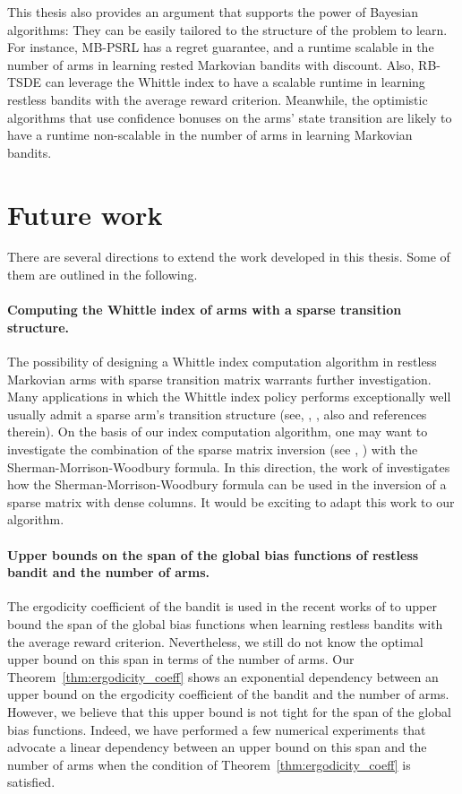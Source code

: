 This thesis also provides an argument that supports the power of Bayesian algorithms: They can be easily tailored to the structure of the problem to learn.
For instance, MB-PSRL has a regret guarantee, and a runtime scalable in the number of arms in learning rested Markovian bandits with discount.
Also, RB-TSDE \cite{akbarzadeh2022learning} can leverage the Whittle index to have a scalable runtime in learning restless bandits with the average reward criterion.
Meanwhile, the optimistic algorithms that use confidence bonuses on the arms' state transition are likely to have a runtime non-scalable in the number of arms in learning Markovian bandits.


\section{Future work}

There are several directions to extend the work developed in this thesis. Some of them are outlined in the following.

\paragraph{Computing the Whittle index of arms with a sparse transition structure.}
The possibility of designing a Whittle index computation algorithm in restless Markovian arms with sparse transition matrix warrants further investigation.
Many applications in which the Whittle index policy performs exceptionally well usually admit a sparse arm's transition structure (see, \eg, \cite{wang1995finite, nino2002dynamic, aalto2018whittle}, also \cite{wang2020restless} and references therein).
On the basis of our index computation algorithm, one may want to investigate the combination of the sparse matrix inversion (see \eg, \cite{dulmage1962inversion, niessner1983computing}) with the Sherman-Morrison-Woodbury formula.
In this direction, the work of \cite{vanderbei1991splitting} investigates how the Sherman-Morrison-Woodbury formula can be used in the inversion of a sparse matrix with dense columns.
It would be exciting to adapt this work to our algorithm.

\paragraph{Upper bounds on the span of the global bias functions of restless bandit and the number of arms.}
The ergodicity coefficient of the bandit is used in the recent works of \cite{akbarzadeh2022learning, xiong2022learning} to upper bound the span of the global bias functions when learning restless bandits with the average reward criterion.
Nevertheless, we still do not know the optimal upper bound on this span in terms of the number of arms. 
Our Theorem~\ref{thm:ergodicity_coeff} shows an exponential dependency between an upper bound on the ergodicity coefficient of the bandit and the number of arms.
However, we believe that this upper bound is not tight for the span of the global bias functions.
Indeed, we have performed a few numerical experiments that advocate a linear dependency between an upper bound on this span and the number of arms when the condition of Theorem~\ref{thm:ergodicity_coeff} is satisfied.


